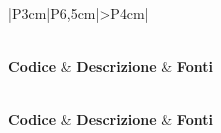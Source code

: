 \bgroup
\begin{adjustwidth}{-0.5cm}{-0.5cm}
  \begin{longtable}{|P{3cm}|P{6,5cm}|>{\arraybackslash}P{4cm}|}
    \caption{Tabella dei requisiti funzionali}
  	\label{tab:requisiti-funzionali} \\
    \hline
    \textbf{Codice} & \textbf{Descrizione} & \textbf{Fonti} \\
    \hline
    \endfirsthead

    \caption[]{Tabella dei requisiti funzionali (continua)} \\
		\hline
		\textbf{Codice} & \textbf{Descrizione} & \textbf{Fonti} \\ 
		\hline
		\endhead

    \hline
		 \\ 
		\hline
		\endfoot

    \hline
		\endlastfoot


\end{longtable}
\end{adjustwidth}
